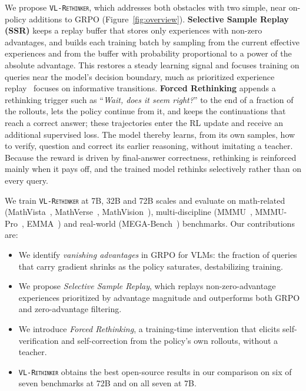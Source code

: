 \documentclass{article}
\newcommand{\model}{\texttt{\textsc{VL-Rethinker}}\xspace}
\begin{document}
We propose \model, which addresses both obstacles with two simple, near on-policy additions to GRPO (Figure~\ref{fig:overview}). \textbf{Selective Sample Replay (SSR)} keeps a replay buffer that stores only experiences with non-zero advantages, and builds each training batch by sampling from the current effective experiences and from the buffer with probability proportional to a power of the absolute advantage. This restores a steady learning signal and focuses training on queries near the model's decision boundary, much as prioritized experience replay~\cite{per} focuses on informative transitions. \textbf{Forced Rethinking} appends a rethinking trigger such as ``\emph{Wait, does it seem right?}'' to the end of a fraction of the rollouts, lets the policy continue from it, and keeps the continuations that reach a correct answer; these trajectories enter the RL update and receive an additional supervised loss. The model thereby learns, from its own samples, how to verify, question and correct its earlier reasoning, without imitating a teacher. Because the reward is driven by final-answer correctness, rethinking is reinforced mainly when it pays off, and the trained model rethinks selectively rather than on every query.


We train \model at 7B, 32B and 72B scales and evaluate on math-related (MathVista~\cite{mathvista}, MathVerse~\cite{mathverse}, MathVision~\cite{mathvision}), multi-discipline (MMMU~\cite{yue2024mmmu}, MMMU-Pro~\cite{mmmupro}, EMMA~\cite{emma}) and real-world (MEGA-Bench~\cite{chen2024mega}) benchmarks. Our contributions are:
\begin{itemize}[leftmargin=*,itemsep=0pt,topsep=2pt]
\item We identify \emph{vanishing advantages} in GRPO for VLMs: the fraction of queries that carry gradient shrinks as the policy saturates, destabilizing training.
\item We propose \emph{Selective Sample Replay}, which replays non-zero-advantage experiences prioritized by advantage magnitude and outperforms both GRPO and zero-advantage filtering.
\item We introduce \emph{Forced Rethinking}, a training-time intervention that elicits self-verification and self-correction from the policy's own rollouts, without a teacher.
\item \model obtains the best open-source results in our comparison on six of seven benchmarks at 72B and on all seven at 7B.
\end{itemize}
\end{document}
